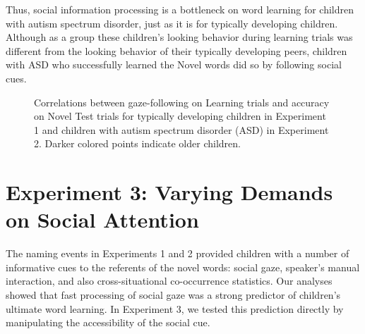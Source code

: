 \documentclass{pnastwo}
\begin{document}
\begin{article}
Thus, social information processing is a bottleneck on word learning for children with autism spectrum disorder, just as it is for typically developing children. Although as a group these children's looking behavior during learning trials was different from the looking behavior of their typically developing peers, children with ASD who successfully learned the Novel words did so by following social cues.

\begin{figure}[tb]
	\caption{\label{fig:corr_plot}Correlations between gaze-following on Learning trials and accuracy on Novel Test trials for typically developing children in Experiment 1 and children with autism spectrum disorder (ASD) in Experiment 2. Darker colored points indicate older children.}
	
\end{figure}

\section{Experiment 3: Varying Demands on Social Attention}

The naming events in Experiments 1 and 2 provided children with a number of informative cues to the referents of the novel words: social gaze, speaker's manual interaction, and also cross-situational co-occurrence statistics. Our analyses showed that fast processing of social gaze was a strong predictor of children's ultimate word learning. In Experiment 3, we tested this prediction directly by manipulating the accessibility of the social cue.


\end{article}
\end{document}
